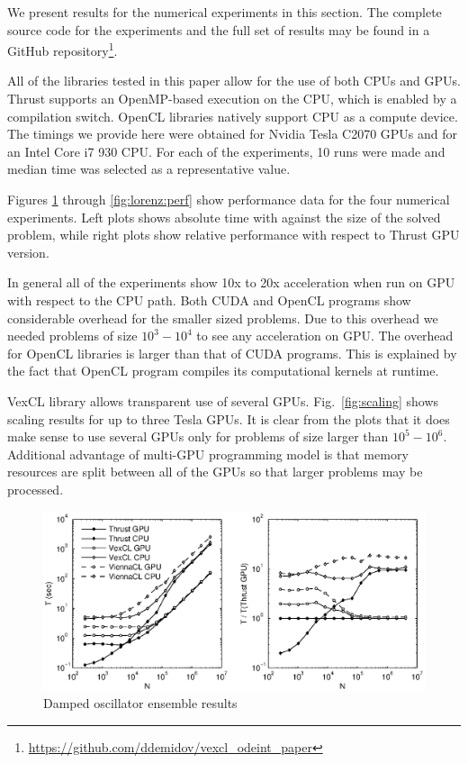 \documentclass[1p]{elsarticle}
\newcommand{\figref}[1]{Fig.~\ref{#1}}
\begin{document}
We present results for the numerical experiments in this section. The complete
source code for the experiments and the full set of results may be found in a
GitHub
repository\footnote{\href{https://github.com/ddemidov/vexcl_odeint_paper}{https://github.com/ddemidov/vexcl\_odeint\_paper}}.

All of the libraries tested in this paper allow for the use of both CPUs and GPUs.
Thrust supports an OpenMP-based execution on the CPU, which is enabled by a
compilation switch. OpenCL libraries natively support CPU as a compute
device.  The timings we provide here were obtained for Nvidia Tesla C2070 GPUs
and for an Intel Core i7 930 CPU. For each of the experiments, 10 runs were made
and median time was selected as a representative value.

Figures \ref{fig:damped:perf} through \ref{fig:lorenz:perf} show performance
data for the four numerical experiments. Left plots shows absolute time with
against the size of the solved problem, while right plots show relative
performance with respect to Thrust GPU version.

In general all of the experiments show 10x to 20x acceleration when run on GPU
with respect to the CPU path. Both CUDA and OpenCL programs show considerable
overhead for the smaller sized problems. Due to this overhead we needed
problems of size $10^3-10^4$ to see any acceleration on GPU. The overhead for
OpenCL libraries is larger than that of CUDA programs. This is explained by the
fact that OpenCL program compiles its computational kernels at runtime.

VexCL library allows transparent use of several GPUs. \figref{fig:scaling}
shows scaling results for up to three Tesla GPUs. It is clear from the plots
that it does make sense to use several GPUs only for problems of size larger
than $10^5-10^6$. Additional advantage of multi-GPU programming model is that
memory resources are split between all of the GPUs so that larger problems may
be processed.

\begin{figure}[p]
    \begin{center}
        \includegraphics[width=\textwidth]{data/damped_oscillator/perfcmp}
    \end{center}
    \caption{Damped oscillator ensemble results}
    \label{fig:damped:perf}
\end{figure}
\end{document}
